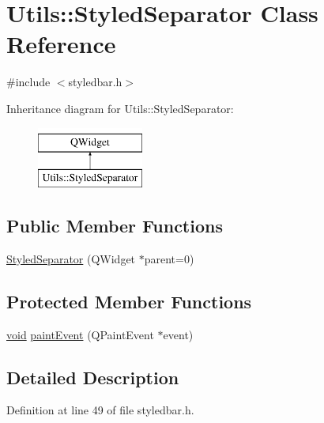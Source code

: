 \hypertarget{class_utils_1_1_styled_separator}{\section{Utils\-:\-:Styled\-Separator Class Reference}
\label{class_utils_1_1_styled_separator}
}


{\ttfamily \#include $<$styledbar.\-h$>$}

Inheritance diagram for Utils\-:\-:Styled\-Separator\-:\begin{figure}[H]
\begin{center}
\leavevmode
\includegraphics[height=2.000000cm]{class_utils_1_1_styled_separator}
\end{center}
\end{figure}
\subsection*{Public Member Functions}
\begin{DoxyCompactItemize}
\item 
\hyperlink{class_utils_1_1_styled_separator_aa6476d6b1d22b156d30d0e83290d6752}{Styled\-Separator} (Q\-Widget $\ast$parent=0)
\end{DoxyCompactItemize}
\subsection*{Protected Member Functions}
\begin{DoxyCompactItemize}
\item 
\hyperlink{group___u_a_v_objects_plugin_ga444cf2ff3f0ecbe028adce838d373f5c}{void} \hyperlink{class_utils_1_1_styled_separator_a5cddfd7427f9e3f1678aed8b9af58674}{paint\-Event} (Q\-Paint\-Event $\ast$event)
\end{DoxyCompactItemize}


\subsection{Detailed Description}


Definition at line 49 of file styledbar.\-h.



